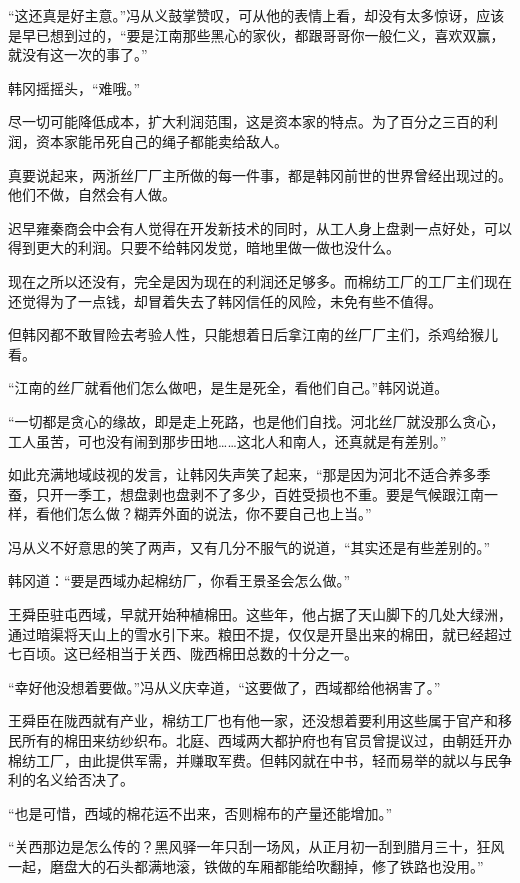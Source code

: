 “这还真是好主意。”冯从义鼓掌赞叹，可从他的表情上看，却没有太多惊讶，应该是早已想到过的，“要是江南那些黑心的家伙，都跟哥哥你一般仁义，喜欢双赢，就没有这一次的事了。”

韩冈摇摇头，“难哦。”

尽一切可能降低成本，扩大利润范围，这是资本家的特点。为了百分之三百的利润，资本家能吊死自己的绳子都能卖给敌人。

真要说起来，两浙丝厂厂主所做的每一件事，都是韩冈前世的世界曾经出现过的。他们不做，自然会有人做。

迟早雍秦商会中会有人觉得在开发新技术的同时，从工人身上盘剥一点好处，可以得到更大的利润。只要不给韩冈发觉，暗地里做一做也没什么。

现在之所以还没有，完全是因为现在的利润还足够多。而棉纺工厂的工厂主们现在还觉得为了一点钱，却冒着失去了韩冈信任的风险，未免有些不值得。

但韩冈都不敢冒险去考验人性，只能想着日后拿江南的丝厂厂主们，杀鸡给猴儿看。

“江南的丝厂就看他们怎么做吧，是生是死全，看他们自己。”韩冈说道。

“一切都是贪心的缘故，即是走上死路，也是他们自找。河北丝厂就没那么贪心，工人虽苦，可也没有闹到那步田地……这北人和南人，还真就是有差别。”

如此充满地域歧视的发言，让韩冈失声笑了起来，“那是因为河北不适合养多季蚕，只开一季工，想盘剥也盘剥不了多少，百姓受损也不重。要是气候跟江南一样，看他们怎么做？糊弄外面的说法，你不要自己也上当。”

冯从义不好意思的笑了两声，又有几分不服气的说道，“其实还是有些差别的。”

韩冈道：“要是西域办起棉纺厂，你看王景圣会怎么做。”

王舜臣驻屯西域，早就开始种植棉田。这些年，他占据了天山脚下的几处大绿洲，通过暗渠将天山上的雪水引下来。粮田不提，仅仅是开垦出来的棉田，就已经超过七百顷。这已经相当于关西、陇西棉田总数的十分之一。

“幸好他没想着要做。”冯从义庆幸道，“这要做了，西域都给他祸害了。”

王舜臣在陇西就有产业，棉纺工厂也有他一家，还没想着要利用这些属于官产和移民所有的棉田来纺纱织布。北庭、西域两大都护府也有官员曾提议过，由朝廷开办棉纺工厂，由此提供军需，并赚取军费。但韩冈就在中书，轻而易举的就以与民争利的名义给否决了。

“也是可惜，西域的棉花运不出来，否则棉布的产量还能增加。”

“关西那边是怎么传的？黑风驿一年只刮一场风，从正月初一刮到腊月三十，狂风一起，磨盘大的石头都满地滚，铁做的车厢都能给吹翻掉，修了铁路也没用。”

